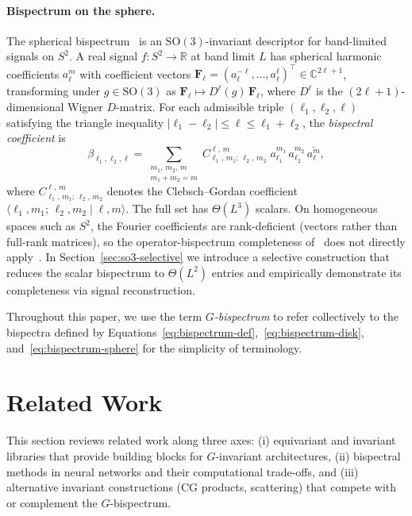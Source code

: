 \documentclass{article}
\theoremstyle{definition}
\theoremstyle{remark}
\newcommand{\R}{\mathbb{R}}
\newcommand{\C}{\mathbb{C}}
\newcommand{\SO}{\mathrm{SO}}
\newcommand{\CG}[6]{C^{#5,\,#6}_{#1,\,#2;\,#3,\,#4}}
\newcommand{\conj}[1]{\overline{#1}}
\theoremstyle{definition}
\begin{document}
\paragraph{Bispectrum on the sphere.}
The spherical bispectrum~\citep{kakarala2012bispectrum} is an
$\SO(3)$-invariant descriptor for band-limited signals on $S^2$.
A real signal $f : S^2 \to \R$ at band limit $L$ has spherical harmonic
coefficients $a_\ell^m$ with coefficient vectors
$\mathbf{F}_\ell = (a_\ell^{-\ell},\ldots,a_\ell^{\ell})^\top
\in \C^{2\ell+1}$, transforming under $g\in\SO(3)$ as
$\mathbf{F}_\ell \mapsto D^\ell(g)\,\mathbf{F}_\ell$, where $D^\ell$
is the $(2\ell{+}1)$-dimensional Wigner $D$-matrix.
For each admissible triple $(\ell_1,\ell_2,\ell)$ satisfying the
triangle inequality
$|\ell_1 - \ell_2| \le \ell \le \ell_1 + \ell_2$, the
\emph{bispectral coefficient} is
\begin{equation}\label{eq:bispectrum-sphere}
  \beta_{\ell_1,\ell_2,\ell}
  = \sum_{\substack{m_1,\,m_2,\,m \\ m_1+m_2=m}}
    \CG{\ell_1}{m_1}{\ell_2}{m_2}{\ell}{m}\;
    a_{\ell_1}^{m_1}\,a_{\ell_2}^{m_2}\,\conj{a_\ell^m},
\end{equation}
where $\CG{\ell_1}{m_1}{\ell_2}{m_2}{\ell}{m}$ denotes the
Clebsch--Gordan coefficient
$\langle \ell_1, m_1;\, \ell_2, m_2 \mid \ell, m \rangle$.
The full set has $\Theta(L^3)$ scalars. On homogeneous spaces such as
$S^2$, the Fourier coefficients are rank-deficient (vectors rather than
full-rank matrices), so the operator-bispectrum completeness
of~\citet{kakarala2012bispectrum} does not directly
apply~\citep{kondor2007novel}. In Section~\ref{sec:so3-selective} we
introduce a selective construction that reduces the scalar bispectrum to
$\Theta(L^2)$ entries and empirically demonstrate its completeness via
signal reconstruction.

Throughout this paper, we use the term \emph{$G$-bispectrum} to refer
collectively to the bispectra defined by
Equations~\eqref{eq:bispectrum-def},~\eqref{eq:bispectrum-disk},
and~\eqref{eq:bispectrum-sphere} for the simplicity of terminology.




\section{Related Work}
\label{sec:related}
This section reviews related work along three axes: (i) equivariant and invariant libraries that provide building blocks for $G$-invariant architectures, (ii) bispectral methods in neural networks and their computational trade-offs, and (iii) alternative invariant constructions (CG products, scattering) that compete with or complement the $G$-bispectrum. 
\end{document}
